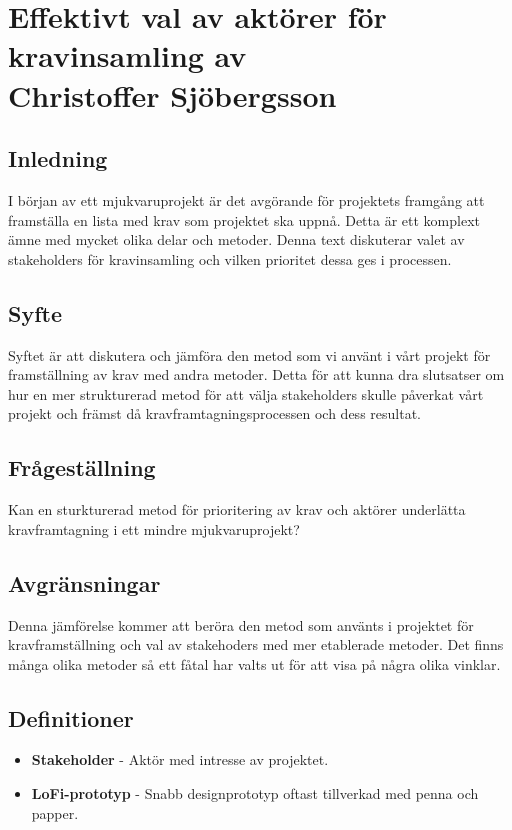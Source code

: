 \chapter{Effektivt val av aktörer för \\kravinsamling av \\ Christoffer Sjöbergsson}

\section{Inledning}
I början av ett mjukvaruprojekt är det avgörande för projektets framgång att framställa en lista med krav som projektet ska uppnå. Detta är ett komplext ämne med mycket olika delar och metoder. Denna text diskuterar valet av stakeholders för kravinsamling och vilken prioritet dessa ges i processen.

\section{Syfte}
Syftet är att diskutera och jämföra den metod som vi använt i vårt projekt för framställning av krav med andra metoder. Detta för att kunna dra slutsatser om hur en mer strukturerad metod för att välja stakeholders skulle påverkat vårt projekt och främst då kravframtagningsprocessen och dess resultat.

\section{Frågeställning}
Kan en sturkturerad metod för prioritering av krav och aktörer underlätta kravframtagning i ett mindre mjukvaruprojekt?

\section{Avgränsningar}
Denna jämförelse kommer att beröra den metod som använts i projektet för kravframställning och val av stakehoders med mer etablerade metoder. Det finns många olika metoder så ett fåtal har valts ut för att visa på några olika vinklar.

\section{Definitioner}
\begin{itemize}
	\item \textbf{Stakeholder} - Aktör med intresse av projektet.
	\item \textbf{LoFi-prototyp} - Snabb designprototyp oftast tillverkad med penna och papper.
\end{itemize}


